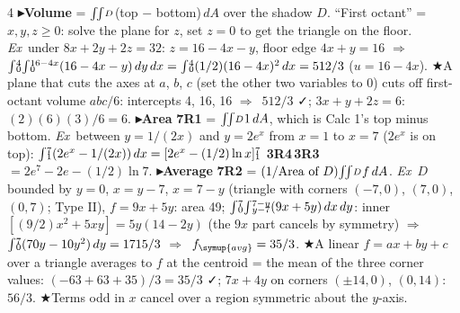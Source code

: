 \documentclass{article}
\newcommand\subx[1]{\sb{\smash{\raise0.20em\hbox{$\scriptstyle#1$}}}}    %
\newcommand\supy[1]{\sp{\smash{\lower0.02em\hbox{$\scriptstyle#1$}}}}    %
\newcommand\suby[1]{\sb{\smash{\raise0.10em\hbox{$\scriptstyle#1$}}}}    %
\newcommand\I[2]{{\smash{\int}}\suby{#1}\supy{#2}}                        %
\newcommand\II[1]{{\smash{\iint}}\subx{#1}}                               %
\newcommand\ev[2]{\suby{#1}\supy{#2}}                                     %
\newcommand\sh[1]{{\setlength\fboxsep{0.18pt}\colorbox{black!22}{\textbf{#1}}}}  %
\newcommand\pt[1]{\textbf{{\symf ▸}#1}}       %
\newcommand\ex{\textit{Ex}\ }                  %
\newcommand\shc{{\symf ★}}                      %
\newcommand\ok{{\symf ✓}}                       %
\newcommand\then{\ensuremath{\Rightarrow}}
\newcommand\av{\symup{avg}}
\begin{document}
\begin{multicols*}{4}
\pt{Volume} = $\II{D}$(top $-$ bottom)$\,dA$ over the shadow $D$. ``First octant'' = $x,y,z\ge0$: solve the plane for $z$, set $z=0$ to get the triangle on the floor. \ex under $8x+2y+2z=32$: $z=16-4x-y$, floor edge $4x+y=16$ \then\ $\I{0}{4}\I{0}{16-4x}(16-4x-y)\,dy\,dx=\I{0}{4}(1/2)(16-4x)^2\,dx=512/3$ ($u=16-4x$). \shc A plane that cuts the axes at $a$, $b$, $c$ (set the other two variables to 0) cuts off first-octant volume $abc/6$: intercepts 4, 16, 16 \then\ $512/3$ \ok; $3x+y+2z=6$: $(2)(6)(3)/6=6$.
\pt{Area} \sh{7R1} = $\II{D}1\,dA$, which is Calc 1's top minus bottom. \ex between $y=1/(2x)$ and $y=2e^x$ from $x=1$ to $x=7$ ($2e^x$ is on top): $\I{1}{7}(2e^x-1/(2x))\,dx=[2e^x-(1/2)\ln x]\ev{1}{7}$ \sh{3R4}\,\sh{3R3} $=2e^7-2e-(1/2)\ln7$.
\pt{Average} \sh{7R2} = $(1/\text{Area of }D)\II{D}f\,dA$. \ex $D$ bounded by $y=0$, $x=y-7$, $x=7-y$ (triangle with corners $(-7,0)$, $(7,0)$, $(0,7)$; Type II), $f=9x+5y$: area 49; $\I{0}{7}\I{y-7}{7-y}(9x+5y)\,dx\,dy$: inner $[(9/2)x^2+5xy]=5y(14-2y)$ (the $9x$ part cancels by symmetry) \then\ $\I{0}{7}(70y-10y^2)\,dy=1715/3$ \then\ $f_\av=35/3$. \shc A linear $f=ax+by+c$ over a triangle averages to $f$ at the centroid = the mean of the three corner values: $(-63+63+35)/3=35/3$ \ok; $7x+4y$ on corners $(\pm14,0)$, $(0,14)$: $56/3$. \shc Terms odd in $x$ cancel over a region symmetric about the $y$-axis.


\end{multicols*}
\end{document}
